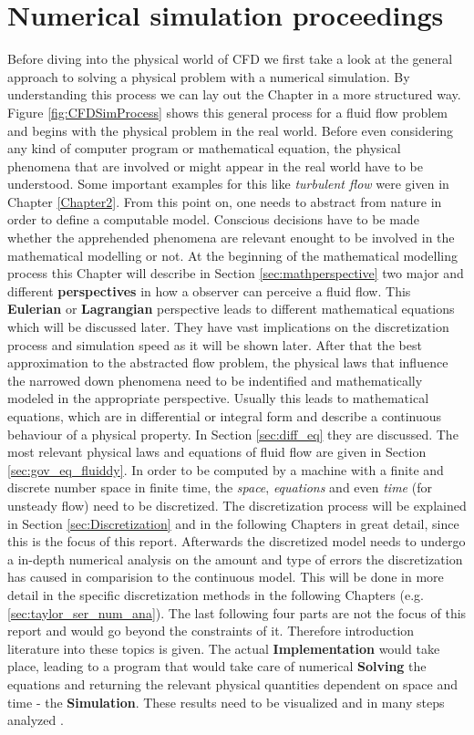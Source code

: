\section {Numerical simulation proceedings}
Before diving into the physical world of CFD we first take a look at the general approach to solving a physical problem with a numerical simulation. By understanding this process we can lay out the Chapter in a more structured way. Figure \ref{fig:CFDSimProcess} shows this general process for a fluid flow problem and begins with the physical problem in the real world. Before even considering any kind of
computer program or mathematical equation, the physical phenomena that are involved or might appear in the real world have to be understood. Some important examples for this like \emph{turbulent flow} were given in Chapter \ref{Chapter2}. From this point on, one needs to abstract from nature in order to define a computable model. Conscious decisions have to be made whether the apprehended phenomena are relevant enought to
be involved in the mathematical modelling or not. At the beginning of the mathematical modelling process this Chapter will describe in Section \ref{sec:mathperspective} two major and different \textbf{perspectives} in how a observer can perceive a fluid flow. This \textbf{Eulerian} or \textbf{Lagrangian} perspective leads to different mathematical equations which will be discussed later. They have vast implications on the discretization process and simulation speed as it will be shown later.  After that the best approximation to the abstracted flow problem, the physical laws that influence the narrowed down
phenomena need to be indentified and mathematically modeled in the appropriate perspective. Usually this leads to mathematical equations, which are in differential or integral form and describe a continuous behaviour of a physical property. In Section \ref{sec:diff_eq} they are discussed. The most relevant physical laws and equations of fluid flow are given in Section \ref{sec:gov_eq_fluiddy}. In order to be computed by a machine with a finite and discrete number space in
finite time, the \emph{space}, \emph{equations} and even \emph{time} (for unsteady flow) need to be discretized. The discretization process will be explained in Section \ref{sec:Discretization} and in the following Chapters in great detail, since this is the focus of this report. Afterwards the discretized model needs to undergo a in-depth numerical analysis on the amount and type of errors the discretization has caused in comparision to the continuous model. This will be done in more detail in the specific discretization methods in the following Chapters (e.g. \ref{sec:taylor_ser_num_ana}). 
The last following four parts are not the focus of this report and would go beyond the constraints of it. Therefore introduction literature into these topics is given.  
The actual \textbf{Implementation} would take place, leading to a program that would take care of numerical \textbf{Solving} the equations and returning the relevant physical quantities dependent on space and time - the \textbf{Simulation}. These results need to be visualized and in many steps analyzed \citep{Oberkampf2010}.

